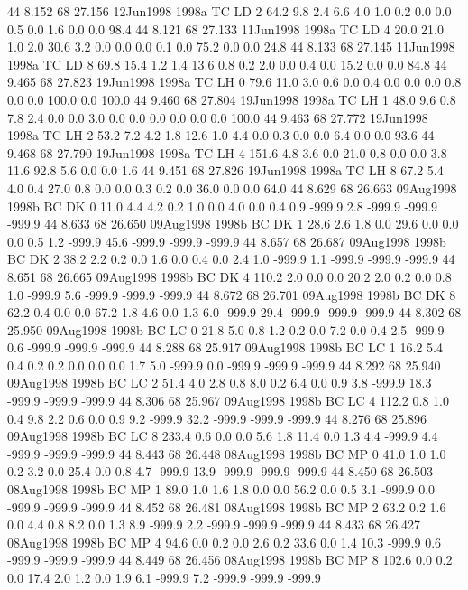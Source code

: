 44 8.152	68 27.156	12Jun1998	1998a	TC	LD	2	64.2	9.8	2.4	6.6	4.0	1.0	0.2	0.0	0.0	0.5	0.0	1.6	0.0	0.0	98.4
44 8.121	68 27.133	11Jun1998	1998a	TC	LD	4	20.0	21.0	1.0	2.0	30.6	3.2	0.0	0.0	0.0	0.1	0.0	75.2	0.0	0.0	24.8
44 8.133	68 27.145	11Jun1998	1998a	TC	LD	8	69.8	15.4	1.2	1.4	13.6	0.8	0.2	2.0	0.0	0.4	0.0	15.2	0.0	0.0	84.8
44 9.465	68 27.823	19Jun1998	1998a	TC	LH	0	79.6	11.0	3.0	0.6	0.0	0.4	0.0	0.0	0.0	0.8	0.0	0.0	100.0	0.0	100.0
44 9.460	68 27.804	19Jun1998	1998a	TC	LH	1	48.0	9.6	0.8	7.8	2.4	0.0	0.0	3.0	0.0	0.0	0.0	0.0	0.0	0.0	100.0
44 9.463	68 27.772	19Jun1998	1998a	TC	LH	2	53.2	7.2	4.2	1.8	12.6	1.0	4.4	0.0	0.3	0.0	0.0	6.4	0.0	0.0	93.6
44 9.468	68 27.790	19Jun1998	1998a	TC	LH	4	151.6	4.8	3.6	0.0	21.0	0.8	0.0	0.0	3.8	11.6	92.8	5.6	0.0	0.0	1.6
44 9.451	68 27.826	19Jun1998	1998a	TC	LH	8	67.2	5.4	4.0	0.4	27.0	0.8	0.0	0.0	0.3	0.2	0.0	36.0	0.0	0.0	64.0
44 8.629	68 26.663	09Aug1998	1998b	BC	DK	0	11.0	4.4	4.2	0.2	1.0	0.0	4.0	0.0	0.4	0.9	-999.9	2.8	-999.9	-999.9	-999.9
44 8.633	68 26.650	09Aug1998	1998b	BC	DK	1	28.6	2.6	1.8	0.0	29.6	0.0	0.0	0.0	0.5	1.2	-999.9	45.6	-999.9	-999.9	-999.9
44 8.657	68 26.687	09Aug1998	1998b	BC	DK	2	38.2	2.2	0.2	0.0	1.6	0.0	0.4	0.0	2.4	1.0	-999.9	1.1	-999.9	-999.9	-999.9
44 8.651	68 26.665	09Aug1998	1998b	BC	DK	4	110.2	2.0	0.0	0.0	20.2	2.0	0.2	0.0	0.8	1.0	-999.9	5.6	-999.9	-999.9	-999.9
44 8.672	68 26.701	09Aug1998	1998b	BC	DK	8	62.2	0.4	0.0	0.0	67.2	1.8	4.6	0.0	1.3	6.0	-999.9	29.4	-999.9	-999.9	-999.9
44 8.302	68 25.950	09Aug1998	1998b	BC	LC	0	21.8	5.0	0.8	1.2	0.2	0.0	7.2	0.0	0.4	2.5	-999.9	0.6	-999.9	-999.9	-999.9
44 8.288	68 25.917	09Aug1998	1998b	BC	LC	1	16.2	5.4	0.4	0.2	0.2	0.0	0.0	0.0	1.7	5.0	-999.9	0.0	-999.9	-999.9	-999.9
44 8.292	68 25.940	09Aug1998	1998b	BC	LC	2	51.4	4.0	2.8	0.8	8.0	0.2	6.4	0.0	0.9	3.8	-999.9	18.3	-999.9	-999.9	-999.9
44 8.306	68 25.967	09Aug1998	1998b	BC	LC	4	112.2	0.8	1.0	0.4	9.8	2.2	0.6	0.0	0.9	9.2	-999.9	32.2	-999.9	-999.9	-999.9
44 8.276	68 25.896	09Aug1998	1998b	BC	LC	8	233.4	0.6	0.0	0.0	5.6	1.8	11.4	0.0	1.3	4.4	-999.9	4.4	-999.9	-999.9	-999.9
44 8.443	68 26.448	08Aug1998	1998b	BC	MP	0	41.0	1.0	1.0	0.2	3.2	0.0	25.4	0.0	0.8	4.7	-999.9	13.9	-999.9	-999.9	-999.9
44 8.450	68 26.503	08Aug1998	1998b	BC	MP	1	89.0	1.0	1.6	1.8	0.0	0.0	56.2	0.0	0.5	3.1	-999.9	0.0	-999.9	-999.9	-999.9
44 8.452	68 26.481	08Aug1998	1998b	BC	MP	2	63.2	0.2	1.6	0.0	4.4	0.8	8.2	0.0	1.3	8.9	-999.9	2.2	-999.9	-999.9	-999.9
44 8.433	68 26.427	08Aug1998	1998b	BC	MP	4	94.6	0.0	0.2	0.0	2.6	0.2	33.6	0.0	1.4	10.3	-999.9	0.6	-999.9	-999.9	-999.9
44 8.449	68 26.456	08Aug1998	1998b	BC	MP	8	102.6	0.0	0.2	0.0	17.4	2.0	1.2	0.0	1.9	6.1	-999.9	7.2	-999.9	-999.9	-999.9
